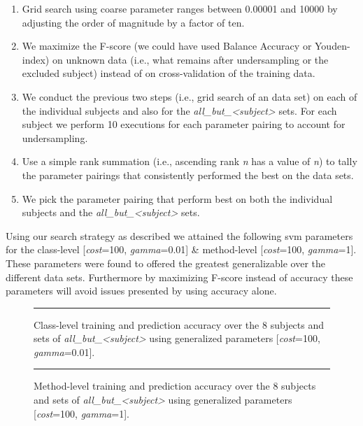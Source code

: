 \begin{enumerate}
  \item Grid search using coarse parameter ranges between 0.00001 and 10000 by adjusting the order of magnitude by a factor of ten.
  \item We maximize the F-score (we could have used Balance Accuracy or Youden-index) on unknown data (i.e., what remains after undersampling or the excluded subject) instead of on cross-validation of the training data.
  \item We conduct the previous two steps (i.e., grid search of an data set) on each of the individual subjects and also for the \emph{all\_but\_<subject>} sets. For each subject we perform 10 executions for each parameter pairing to account for  undersampling.
  \item Use a simple rank summation (i.e., ascending rank \emph{n} has a value of \emph{n}) to tally the parameter pairings that consistently performed the best on the data sets.
  \item We pick the parameter pairing that perform best on both the individual subjects and the \emph{all\_but\_<subject>} sets.
\end{enumerate}

Using our search strategy as described we attained the following \gls{svm} parameters for the class-level [\emph{cost}=100, \emph{gamma}=0.01] \& method-level [\emph{cost}=100, \emph{gamma}=1]. These parameters were found to offered the greatest generalizable over the different data sets. Furthermore by maximizing F-score instead of accuracy these parameters will avoid issues presented by using accuracy alone.

\begin{figure}[!ht]
  \centering
  \begin{adjustbox}{max size={.95\textwidth}{.95\textheight}}
    
  \end{adjustbox}
  \caption{Class-level training and prediction accuracy over the 8 subjects and sets of \emph{all\_but\_<subject>} using generalized parameters [\emph{cost}=100, \emph{gamma}=0.01].}
  \vspace{2mm}
  \hrule
  \label{fig:prediction_with_parameters_class_graph}
\end{figure}

\begin{figure}[!ht]
  \centering
  \begin{adjustbox}{max size={.95\textwidth}{.95\textheight}}
    
  \end{adjustbox}
  \caption{Method-level training and prediction accuracy over the 8 subjects and sets of \emph{all\_but\_<subject>} using generalized parameters [\emph{cost}=100, \emph{gamma}=1].}
  \vspace{2mm}
  \hrule
  \label{fig:prediction_with_parameters_method_graph}
\end{figure}

